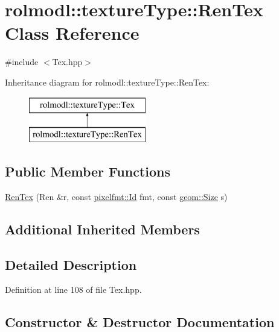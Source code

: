 \hypertarget{classrolmodl_1_1texture_type_1_1_ren_tex}{}\section{rolmodl\+::texture\+Type\+::Ren\+Tex Class Reference}
\label{classrolmodl_1_1texture_type_1_1_ren_tex}


{\ttfamily \#include $<$Tex.\+hpp$>$}

Inheritance diagram for rolmodl\+::texture\+Type\+::Ren\+Tex\+:\begin{figure}[H]
\begin{center}
\leavevmode
\includegraphics[height=2.000000cm]{classrolmodl_1_1texture_type_1_1_ren_tex}
\end{center}
\end{figure}
\subsection*{Public Member Functions}
\begin{DoxyCompactItemize}
\item 
\mbox{\hyperlink{classrolmodl_1_1texture_type_1_1_ren_tex_a04e80caf516e3402f759d296998fcb4b}{Ren\+Tex}} (Ren \&r, const \mbox{\hyperlink{namespacerolmodl_1_1pixelfmt_a96282713e4465ba9211c8fd3a702b52b}{pixelfmt\+::\+Id}} fmt, const \mbox{\hyperlink{structrolmodl_1_1geom_1_1_size}{geom\+::\+Size}} s)
\end{DoxyCompactItemize}
\subsection*{Additional Inherited Members}


\subsection{Detailed Description}


Definition at line 108 of file Tex.\+hpp.



\subsection{Constructor \& Destructor Documentation}
\mbox{\label{classrolmodl_1_1texture_type_1_1_ren_tex_a04e80caf516e3402f759d296998fcb4b}} 
